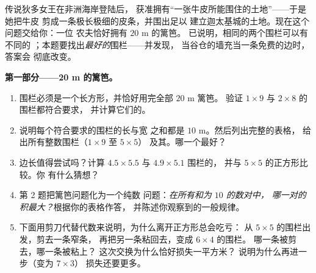 \begin{problem}
\label{pb:g6:measure:1}
传说狄多女王在非洲海岸登陆后，
获准拥有“一张牛皮所能围住的土地”——于是她把牛皮
剪成一条极长极细的皮条，并围出足以
建立迦太基城的土地。现在这个问题交给你：一位
农夫恰好拥有 $20$ m 的篱笆。
已说明，相同的两个围栏可以有不同的
；本题要找出\emph{最好的}围栏——并发现，
当谷仓的墙充当一条免费的边时，答案会
彻底改变。

\medskip
\noindent\textbf{第一部分——20 m 的篱笆。}
\begin{enumerate}
  \item 围栏必须是一个长方形，并恰好用完全部 $20$ m 篱笆。
        验证 $1 \times 9$ 与 $2 \times 8$ 的围栏都符合要求，
        并计算它们的。
  \item 说明每个符合要求的围栏的长与宽
        之和都是 $10$ m。然后列出完整的表格，
        给出所有整数围栏（$1 \times 9$ 至 $5 \times 5$）
        及其。哪一个最好？
  \item {}边长值得尝试吗？计算
        $4.5 \times 5.5$ 与 $4.9 \times 5.1$ 围栏的，
        并与 $5 \times 5$ 的正方形比较。你
        有什么猜想？
  \item 第 2 题把篱笆问题化为一个纯数
        问题：\emph{在所有和为 $10$ 的数对中，
        哪一对的积最大？}根据你的表格作答，
        并陈述你观察到的一般规律。
  \item 下面用剪刀代替代数来说明，为什么离开正方形总会吃亏：
        从 $5 \times 5$ 的围栏出发，剪去一条窄条，
        再把另一条粘回去，变成 $6 \times 4$ 的围栏。
        哪一条被剪去，哪一条被粘上？
        这次交换为什么恰好损失一平方米？
        说明为什么再进一步（变为 $7 \times 3$）
        损失还要更多。
\end{enumerate}


\end{problem}
